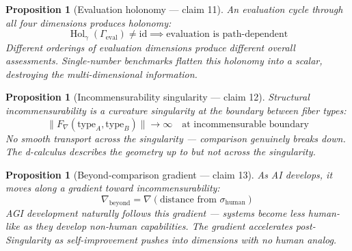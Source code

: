 \documentclass[11pt,a4paper]{article}
\newtheorem{proposition}[definition]{Proposition}
\begin{document}
\begin{proposition}[Evaluation holonomy --- claim 11]
\label{prop:eval}
An evaluation cycle through all four dimensions produces holonomy:
\[
  \operatorname{Hol}_\gamma(\Gamma_{\text{eval}}) \neq \mathrm{id}
  \implies \text{evaluation is path-dependent}
\]
Different orderings of evaluation dimensions produce different overall
assessments. Single-number benchmarks flatten this holonomy into a
scalar, destroying the multi-dimensional information.
\end{proposition}

\begin{proposition}[Incommensurability singularity --- claim 12]
\label{prop:singular}
Structural incommensurability is a curvature singularity at the
boundary between fiber types:
\[
  \|F_\nabla(\text{type}_A, \text{type}_B)\| \to \infty \quad
  \text{at incommensurable boundary}
\]
No smooth transport across the singularity --- comparison genuinely
breaks down. The d-calculus describes the geometry up to but not
across the singularity.
\end{proposition}

\begin{proposition}[Beyond-comparison gradient --- claim 13]
\label{prop:gradient}
As AI develops, it moves along a gradient toward incommensurability:
\[
  \nabla_{\text{beyond}} = \nabla\left(\text{distance from }
    \sigma_{\text{human}}\right)
\]
AGI development naturally follows this gradient --- systems become less
human-like as they develop non-human capabilities. The gradient
accelerates post-Singularity as self-improvement pushes into
dimensions with no human analog.
\end{proposition}
\end{document}
